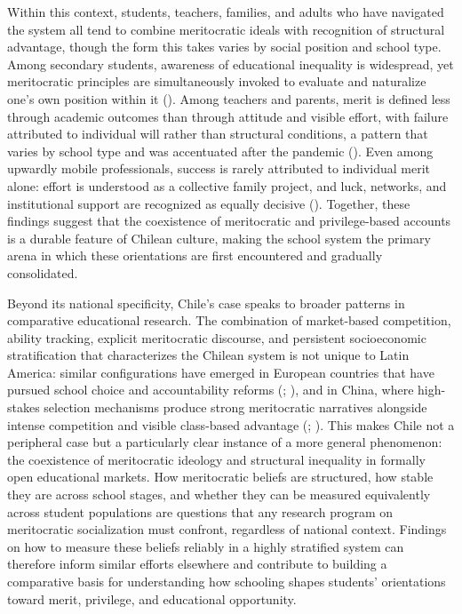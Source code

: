 \documentclass[
  13pt,
]{article}
\begin{document}
Within this context, students, teachers, families, and adults who have
navigated the system all tend to combine meritocratic ideals with
recognition of structural advantage, though the form this takes varies
by social position and school type. Among secondary students, awareness
of educational inequality is widespread, yet meritocratic principles are
simultaneously invoked to evaluate and naturalize one's own position
within it (). Among teachers and parents, merit is defined less through
academic outcomes than through attitude and visible effort, with failure
attributed to individual will rather than structural conditions, a
pattern that varies by school type and was accentuated after the
pandemic (). Even among upwardly mobile professionals, success is rarely
attributed to individual merit alone: effort is understood as a
collective family project, and luck, networks, and institutional support
are recognized as equally decisive
(). Together,
these findings suggest that the coexistence of meritocratic and
privilege-based accounts is a durable feature of Chilean culture, making
the school system the primary arena in which these orientations are
first encountered and gradually consolidated.

Beyond its national specificity, Chile's case speaks to broader patterns
in comparative educational research. The combination of market-based
competition, ability tracking, explicit meritocratic discourse, and
persistent socioeconomic stratification that characterizes the Chilean
system is not unique to Latin America: similar configurations have
emerged in European countries that have pursued school choice and
accountability reforms (; ), and in
China, where high-stakes selection mechanisms produce strong
meritocratic narratives alongside intense competition and visible
class-based advantage (; ). This
makes Chile not a peripheral case but a particularly clear instance of a
more general phenomenon: the coexistence of meritocratic ideology and
structural inequality in formally open educational markets. How
meritocratic beliefs are structured, how stable they are across school
stages, and whether they can be measured equivalently across student
populations are questions that any research program on meritocratic
socialization must confront, regardless of national context. Findings on
how to measure these beliefs reliably in a highly stratified system can
therefore inform similar efforts elsewhere and contribute to building a
comparative basis for understanding how schooling shapes students'
orientations toward merit, privilege, and educational opportunity.
\end{document}
